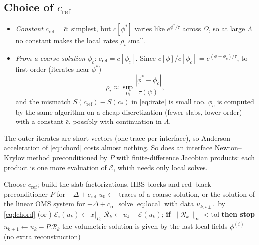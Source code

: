 \documentclass[11pt,a4paper]{article}
\theoremstyle{remark}\newtheorem{remark}{Remark}
\newcommand{\cR}{c_{\mathrm{ref}}}
\begin{document}
\subsection{Choice of \texorpdfstring{$\cR$}{c\_ref}}
\begin{itemize}
  \item \emph{Constant} $\cR=\bar c$: simplest, but $c[\phi^*]$ varies like
    $e^{\phi^*/\tau}$ across $\Omega$, so at large $\Lambda$ no constant makes
    the local rates $\rho_i$ small.
  \item \emph{From a coarse solution} $\phi_c$: $\cR=c[\phi_c]$.
    Since $c[\phi]/c[\phi_c]=e^{(\phi-\phi_c)/\tau}$, to first order (iterates
    near $\phi^*$)
    \begin{equation}
      \rho_i\approx\sup_{\Omega_i}\frac{|\phi^*-\phi_c|}{\tau(\psi)},
    \end{equation}
    and the mismatch $S(\cR)-S(c_*)$ in \eqref{eq:irate} is small too. $\phi_c$
    is computed by the same algorithm on a cheap discretization (fewer slabs,
    lower order) with a constant $\bar c$, possibly with continuation in
    $\Lambda$.
\end{itemize}
The outer iterates are short vectors (one trace per interface), so Anderson
acceleration of \eqref{eq:ichord} costs almost nothing. So does an interface
Newton--Krylov method preconditioned by $P$ with finite-difference Jacobian
products: each product is one more evaluation of $\mathcal E$, which needs only
local solves.

\begin{algorithm}[h]
\caption{Fixed-point iteration on the interface system}\label{alg:chord}
\begin{algorithmic}[1]
\State Choose $\cR$; build the slab factorizations, HBS blocks and red--black preconditioner $P$ for $-\Delta+\cR$ 
\State $u_0\gets$ traces of a coarse solution, or the solution of the linear OMS system for $-\Delta+\cR$
   
    \State solve \eqref{eq:local} with data $u_{k,i\pm1}$ by \eqref{eq:lchord} (or )
    \State $\mathcal E_i(u_k)\gets x|_{\Gamma_i}$ 
  \EndFor
  \State $\mathcal R_k\gets u_k-\mathcal E(u_k)$; \textbf{if} $\|\mathcal R_k\|_\infty<\mathrm{tol}$ \textbf{then stop}
  \State $u_{k+1}\gets u_k-P\,\mathcal R_k$ 
\EndFor
\State the volumetric solution is given by the last local fields $\phi^{(i)}$ (no extra reconstruction)
\end{algorithmic}
\end{algorithm}
\end{document}
